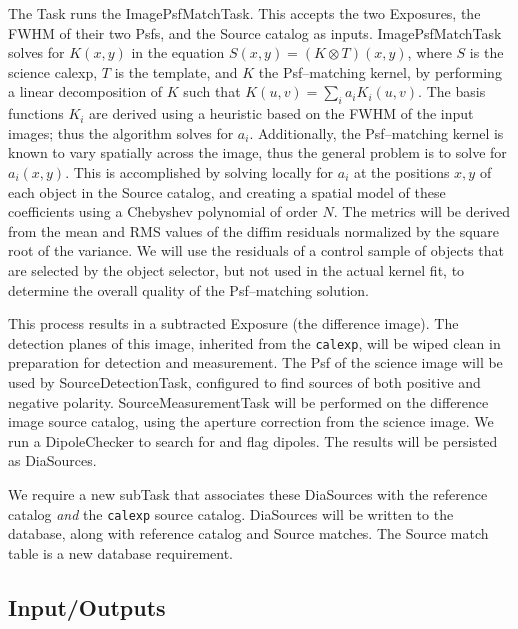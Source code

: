 \documentclass[prd, nofootinbib, floatfix, 11pt,tightenlines,times]{article}
\begin{document}
The Task runs the ImagePsfMatchTask.  This accepts the two
Exposures, the FWHM of their two Psfs, and the Source catalog as
inputs.  ImagePsfMatchTask solves for $K(x,y)$ in the equation $S(x,y)
= (K \otimes T)(x,y)$, where $S$ is the science calexp, $T$ is the
template, and $K$ the Psf--matching kernel, by performing a linear
decomposition of $K$ such that $K(u,v) = \sum_i a_i K_i(u,v)$.  The
basis functions $K_i$ are derived using a heuristic based on the FWHM
of the input images; thus the algorithm solves for $a_i$.
Additionally, the Psf--matching kernel is known to vary spatially
across the image, thus the general problem is to solve for $a_i(x,y)$.
This is accomplished by solving locally for $a_i$ at the positions
$x,y$ of each object in the Source catalog, and creating a spatial
model of these coefficients using a Chebyshev polynomial of order $N$.
The metrics will be derived from the mean and RMS values of the diffim
residuals normalized by the square root of the variance.  We will use
the residuals of a control sample of objects that are selected by the
object selector, but not used in the actual kernel fit, to determine
the overall quality of the Psf--matching solution.

This process results in a subtracted Exposure (the difference image).
The detection planes of this image, inherited from the {\tt calexp},
will be wiped clean in preparation for detection and measurement.  The
Psf of the science image will be used by SourceDetectionTask,
configured to find sources of both positive and negative polarity.
SourceMeasurementTask will be performed on the difference image source
catalog, using the aperture correction from the science image.  We run
a DipoleChecker to search for and flag dipoles.  The results will be
persisted as DiaSources.  

We require a new subTask that associates these DiaSources with the
reference catalog {\it and} the {\tt calexp} source catalog.
DiaSources will be written to the database, along with reference
catalog and Source matches.  The Source match table is a new database
requirement.

\subsection{Input/Outputs}
\end{document}
